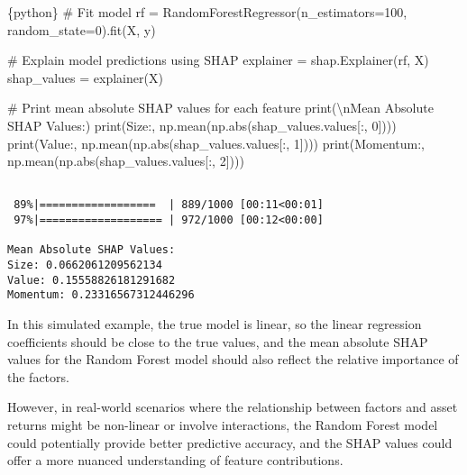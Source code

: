 \documentclass[
  letterpaper,
  DIV=11,
  numbers=noendperiod]{scrartcl}
\newenvironment{Shaded}{\begin{snugshade}}{\end{snugshade}}
\newcommand{\BuiltInTok}[1]{\textcolor[rgb]{0.00,0.23,0.31}{#1}}
\newcommand{\CharTok}[1]{\textcolor[rgb]{0.13,0.47,0.30}{#1}}
\newcommand{\CommentTok}[1]{\textcolor[rgb]{0.37,0.37,0.37}{#1}}
\newcommand{\DecValTok}[1]{\textcolor[rgb]{0.68,0.00,0.00}{#1}}
\newcommand{\InformationTok}[1]{\textcolor[rgb]{0.37,0.37,0.37}{#1}}
\newcommand{\NormalTok}[1]{\textcolor[rgb]{0.00,0.23,0.31}{#1}}
\newcommand{\OperatorTok}[1]{\textcolor[rgb]{0.37,0.37,0.37}{#1}}
\newcommand{\StringTok}[1]{\textcolor[rgb]{0.13,0.47,0.30}{#1}}
\begin{document}
\begin{Shaded}
\begin{Highlighting}[]
\InformationTok{\textasciigrave{}\textasciigrave{}\textasciigrave{}\{python\}}
\CommentTok{\# Fit model}
\NormalTok{rf }\OperatorTok{=}\NormalTok{ RandomForestRegressor(n\_estimators}\OperatorTok{=}\DecValTok{100}\NormalTok{, random\_state}\OperatorTok{=}\DecValTok{0}\NormalTok{).fit(X, y)}

\CommentTok{\# Explain model predictions using SHAP}
\NormalTok{explainer }\OperatorTok{=}\NormalTok{ shap.Explainer(rf, X)}
\NormalTok{shap\_values }\OperatorTok{=}\NormalTok{ explainer(X)}

\CommentTok{\# Print mean absolute SHAP values for each feature}
\BuiltInTok{print}\NormalTok{(}\StringTok{\textquotesingle{}}\CharTok{\textbackslash{}n}\StringTok{Mean Absolute SHAP Values:\textquotesingle{}}\NormalTok{)}
\BuiltInTok{print}\NormalTok{(}\StringTok{\textquotesingle{}Size:\textquotesingle{}}\NormalTok{, np.mean(np.}\BuiltInTok{abs}\NormalTok{(shap\_values.values[:, }\DecValTok{0}\NormalTok{])))}
\BuiltInTok{print}\NormalTok{(}\StringTok{\textquotesingle{}Value:\textquotesingle{}}\NormalTok{, np.mean(np.}\BuiltInTok{abs}\NormalTok{(shap\_values.values[:, }\DecValTok{1}\NormalTok{])))}
\BuiltInTok{print}\NormalTok{(}\StringTok{\textquotesingle{}Momentum:\textquotesingle{}}\NormalTok{, np.mean(np.}\BuiltInTok{abs}\NormalTok{(shap\_values.values[:, }\DecValTok{2}\NormalTok{])))}
\InformationTok{\textasciigrave{}\textasciigrave{}\textasciigrave{}}
\end{Highlighting}
\end{Shaded}

\begin{verbatim}

 89%|==================  | 889/1000 [00:11<00:01]       
 97%|=================== | 972/1000 [00:12<00:00]       

Mean Absolute SHAP Values:
Size: 0.0662061209562134
Value: 0.15558826181291682
Momentum: 0.23316567312446296
\end{verbatim}

In this simulated example, the true model is linear, so the linear
regression coefficients should be close to the true values, and the mean
absolute SHAP values for the Random Forest model should also reflect the
relative importance of the factors.

However, in real-world scenarios where the relationship between factors
and asset returns might be non-linear or involve interactions, the
Random Forest model could potentially provide better predictive
accuracy, and the SHAP values could offer a more nuanced understanding
of feature contributions.
\end{document}
